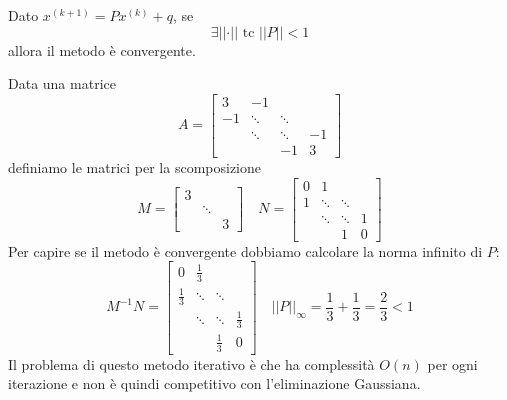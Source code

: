 \begin{theorem}
	Dato $x^{(k+1)} = Px^{(k)}+q$, se
	\begin{equation}
		\exists \lvert\lvert\cdot\rvert\rvert \text{ tc } \lvert\lvert P \rvert\rvert <1
	\end{equation}
	allora il metodo è convergente.
\end{theorem}

\begin{example}
	Data una matrice
	\begin{equation*}
		A = \begin{bmatrix}
			3 & -1 & \\ 
			-1 & \ddots & \ddots \\
			 & \ddots & \ddots & -1\\
			 & & -1 & 3
		\end{bmatrix}
	\end{equation*}
	definiamo le matrici per la scomposizione
	\begin{equation*}
		M = \begin{bmatrix}
			3 \\
			& \ddots \\
			& & 3
		\end{bmatrix} \quad
		N = \begin{bmatrix}
			0 & 1 \\
			1 & \ddots & \ddots \\
			& \ddots & \ddots & 1 \\
			& & 1 &0
		\end{bmatrix}
	\end{equation*}
	Per capire se il metodo è convergente dobbiamo calcolare la norma infinito di $P$:
	\begin{equation*}
		M^{-1} N = \begin{bmatrix}
			0 & \frac{1}{3} \\
			\frac{1}{3} & \ddots & \ddots \\
			& \ddots & \ddots & \frac{1}{3}\\
			& & \frac{1}{3} & 0
		\end{bmatrix} \quad
		\lvert\lvert P \rvert\rvert_{\infty}= \frac{1}{3} + \frac{1}{3} = \frac{2}{3} < 1
	\end{equation*}
	Il problema di questo metodo iterativo è che ha complessità $O(n)$ per ogni iterazione e non è quindi competitivo con l'eliminazione Gaussiana.
\end{example}

